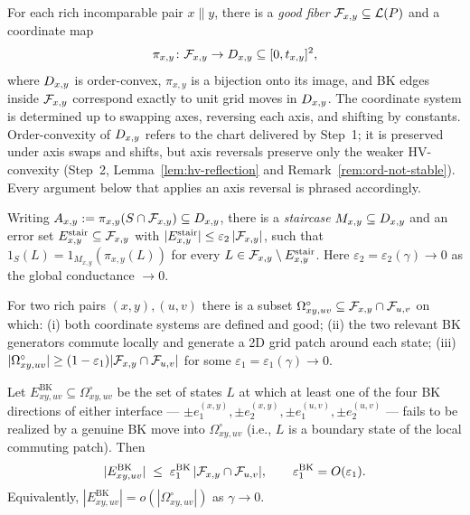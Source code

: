 \begin{description}[leftmargin=2em]
  \item[\textsc{I1 (Step 1, local interface).}]
  For each rich incomparable pair $x\parallel y$, there is a \emph{good fiber}
  $\mathcal{F}_{x,y}\subseteq\mathcal{L}(P)$ and a coordinate map
  \[
    \pi_{x,y}\colon \mathcal{F}_{x,y}\to D_{x,y}\subseteq[0,t_{x,y}]^2,
  \]
  where $D_{x,y}$ is order-convex, $\pi_{x,y}$ is a bijection onto its image, and
  BK edges inside $\mathcal{F}_{x,y}$ correspond exactly to unit grid moves in $D_{x,y}$.
  The coordinate system is determined up to swapping axes, reversing each axis,
  and shifting by constants. Order-convexity of $D_{x,y}$ refers to the chart
  delivered by Step~1; it is preserved under axis swaps and shifts, but axis
  reversals preserve only the weaker HV-convexity (Step~2,
  Lemma~\ref{lem:hv-reflection} and Remark~\ref{rem:ord-not-stable}). Every
  argument below that applies an axis reversal is phrased accordingly.
  \item[\textsc{I2 (Step 2, fiber rigidity).}]
  Writing $A_{x,y}:=\pi_{x,y}(S\cap\mathcal{F}_{x,y})\subseteq D_{x,y}$, there is a
  \emph{staircase} $M_{x,y}\subseteq D_{x,y}$ and an error set
  $E^{\mathrm{stair}}_{x,y}\subseteq\mathcal{F}_{x,y}$ with
  $|E^{\mathrm{stair}}_{x,y}|\le\varepsilon_2\,|\mathcal{F}_{x,y}|$, such that
  $1_S(L)=1_{M_{x,y}}(\pi_{x,y}(L))$ for every $L\in\mathcal{F}_{x,y}\setminus
  E^{\mathrm{stair}}_{x,y}$. Here $\varepsilon_2=\varepsilon_2(\gamma)\to 0$ as the
  global conductance $\to 0$.
  \item[\textsc{I3 (Step 1, overlap commutation).}]
  For two rich pairs $(x,y),(u,v)$ there is a subset
  $\Omega^{\circ}_{xy,uv}\subseteq\mathcal{F}_{x,y}\cap\mathcal{F}_{u,v}$ on which:
  (i) both coordinate systems are defined and good;
  (ii) the two relevant BK generators commute locally and generate a 2D grid
  patch around each state;
  (iii) $|\Omega^{\circ}_{xy,uv}|\ge (1-\varepsilon_1)|\mathcal{F}_{x,y}\cap\mathcal{F}_{u,v}|$ for some
  $\varepsilon_1=\varepsilon_1(\gamma)\to 0$.
  \item[\textsc{I3$'$ (Step 1, quantitative BK availability).}]
  Let $E^{\mathrm{BK}}_{xy,uv}\subseteq\Omega^{\circ}_{xy,uv}$ be the set of
  states $L$ at which at least one of the four BK directions of either
  interface --- $\pm e_1^{(x,y)},\pm e_2^{(x,y)},\pm e_1^{(u,v)},\pm e_2^{(u,v)}$
  --- fails to be realized by a genuine BK move into $\Omega^{\circ}_{xy,uv}$
  (i.e., $L$ is a boundary state of the local commuting patch). Then
  \[
    |E^{\mathrm{BK}}_{xy,uv}|\;\le\;\varepsilon_1^{\mathrm{BK}}\,|\mathcal{F}_{x,y}\cap\mathcal{F}_{u,v}|,
    \qquad \varepsilon_1^{\mathrm{BK}}=O(\varepsilon_1).
  \]
  Equivalently, $|E^{\mathrm{BK}}_{xy,uv}|=o(|\Omega^{\circ}_{xy,uv}|)$ as
  $\gamma\to 0$.
\end{description}

